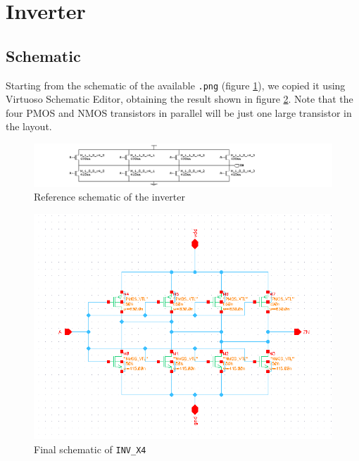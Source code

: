 \documentclass[a4paper]{article}
\newcommand{\inv}{\texttt{INV\_X4}\xspace}
\begin{document}
\section{Inverter}
\subsection{Schematic}
Starting from the schematic of the available \texttt{.png} (figure \ref{fig:inv_png}), we copied it using Virtuoso Schematic Editor, obtaining the result shown in figure \ref{fig:inv_schematic}. Note that the four PMOS and NMOS transistors in parallel will be just one large transistor in the layout.
\begin{figure}[H]
	\centering
	\includegraphics[width=1.2\linewidth]{../INV_X4/INV_X4.png}
	\caption{Reference schematic of the inverter}
	\label{fig:inv_png}
\end{figure}
\begin{figure}[H]
	\centering
	\includegraphics[width=\linewidth]{../INV_X4/INV_X4_schematic.png}
	\caption{Final schematic of \inv}
	\label{fig:inv_schematic}
\end{figure}
\end{document}
